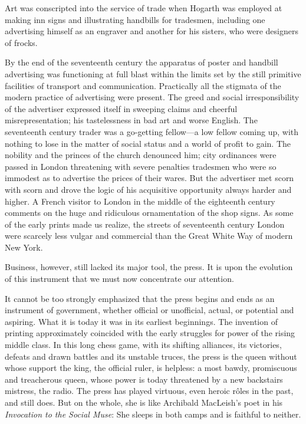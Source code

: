 \documentclass[openany,nobib]{tufte-book}
\begin{document}
Art was conscripted into the service of trade when Hogarth was employed
at making inn signs and illustrating handbills for tradesmen, including
one advertising himself as an engraver and another for his sisters, who
were designers of frocks.

By the end of the seventeenth century the apparatus of poster and
handbill advertising was functioning at full blast within the limits set
by the still primitive facilities of transport and communication.
Practically all the stigmata of the modern practice of advertising were
present. The greed and social irresponsibility of the advertiser
expressed itself in sweeping claims and cheerful misrepresentation; his
tastelessness in bad art and worse English. The seventeenth century
trader was a go-getting fellow---a low fellow coming up, with nothing to
lose in the matter of social status and a world of profit to gain. The
nobility and the princes of the church denounced him; city ordinances
were passed in London threatening with severe penalties tradesmen who
were so immodest as to advertise the prices of their wares. But the
advertiser met scorn with scorn and drove the logic of his acquisitive
opportunity always harder and higher. A French visitor to London in the
middle of the eighteenth century comments on the huge and ridiculous
ornamentation of the shop signs. As some of the early prints made us
realize, the streets of seventeenth century London were scarcely less
vulgar and commercial than the Great White Way of modern New York.

Business, however, still lacked its major tool, the press. It is upon
the evolution of this instrument that we must now concentrate our
attention.

It cannot be too strongly emphasized that the press begins and ends as
an instrument of government, whether official or unofficial, actual, or
potential and aspiring. What it is today it was in its earliest
beginnings. The invention of printing approximately coincided with the
early struggles for power of the rising middle class. In this long chess
game, with its shifting alliances, its victories, defeats and drawn
battles and its unstable truces, the press is the queen without whose
support the king, the official ruler, is helpless: a most bawdy,
promiscuous and treacherous queen, whose power is today threatened by a
new backstairs mistress, the radio. The press has played virtuous, even
heroic r\^oles in the past, and still does. But on the whole, she is like
Archibald MacLeish's poet in his \emph{Invocation to the Social Muse}:
She sleeps in both camps and is faithful to neither.
\end{document}
